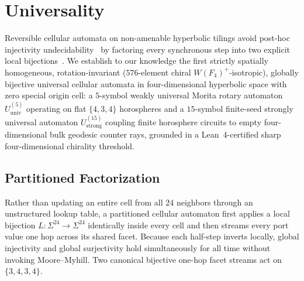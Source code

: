 \section{Universality}
\label{sec:universality}

Reversible cellular automata on non-amenable hyperbolic tilings avoid post-hoc injectivity undecidability~\cite{margenstern2008injectivity} by factoring every synchronous step into two explicit local bijections~\cite{margolus1984,morita2017book}. We establish to our knowledge the first strictly spatially homogeneous, rotation-invariant ($576$-element chiral $W(F_4)^+$-isotropic), globally bijective universal cellular automata in four-dimensional hyperbolic space with zero special origin cell: a $5$-symbol weakly universal Morita rotary automaton $U_{\mathrm{univ}}^{(5)}$ operating on flat $\{4,3,4\}$ horospheres and a $15$-symbol finite-seed strongly universal automaton $U_{\mathrm{strong}}^{(15)}$ coupling finite horosphere circuits to empty four-dimensional bulk geodesic counter rays, grounded in a Lean~4-certified sharp four-dimensional chirality threshold.

\subsection{Partitioned Factorization}
\label{subsec:partitioned-factorization}

Rather than updating an entire cell from all $24$ neighbors through an unstructured lookup table, a partitioned cellular automaton first applies a local bijection $L : \Sigma^{24} \to \Sigma^{24}$ identically inside every cell and then streams every port value one hop across its shared facet. Because each half-step inverts locally, global injectivity and global surjectivity hold simultaneously for all time without invoking Moore--Myhill. Two canonical bijective one-hop facet streams act on $\{3,4,3,4\}$.

